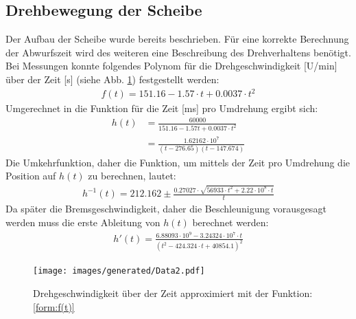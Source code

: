 \subsection{Drehbewegung der Scheibe}
Der Aufbau der Scheibe wurde bereits beschrieben.
Für eine korrekte Berechnung der Abwurfszeit wird des weiteren eine Beschreibung des Drehverhaltens benötigt.
Bei Messungen konnte folgendes Polynom für die Drehgeschwindigkeit [U/min] über der Zeit [s] (siehe Abb. \ref{img:drehgeschw}) festgestellt werden:
\begin{align}
	f(t) = 151.16 - 1.57 \cdot t + 0.0037 \cdot t^2 \label{form:f(t)}
\end{align}
Umgerechnet in die Funktion für die Zeit [ms] pro Umdrehung ergibt sich:
\begin{align}
	h(t) 	&= \frac{60000}{151.16 - 1.57t + 0.0037 \cdot t^2} \\
	    	&= \frac{1.62162\cdot 10^7}{(t-276.65) (t-147.674)} \label{form:h(t)}
\end{align}
Die Umkehrfunktion, daher die Funktion, um mittels der Zeit pro Umdrehung die Position auf $h(t)$ zu berechnen, lautet:
\begin{align}
	h^{-1}(t) 	= 212.162 \pm \frac{0.27027 \cdot \sqrt{56933\cdot t^2 + 2.22\cdot 10^8 \cdot t}}{t} \label{form:h-1(t)}
\end{align}
Da später die Bremsgeschwindigkeit, daher die Beschleunigung vorausgesagt werden muss die erste Ableitung von $h(t)$ berechnet werden:
\begin{align}
	h'(t) 	= \frac{6.88093\cdot 10^9 - 3.24324 \cdot 10^7 \cdot t}{(t^2 - 424.324\cdot t + 40854.1)^2} \label{form:h'(t)}
\end{align}

\begin{figure}[hb] \centering
	\texttt{[image: images/generated/Data2.pdf]}
	\caption{Drehgeschwindigkeit über der Zeit approximiert mit der Funktion: \ref{form:f(t)}}
	\label{img:drehgeschw}
\end{figure}

